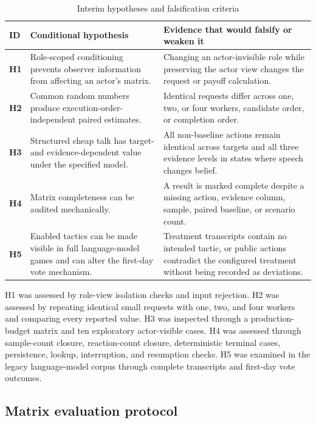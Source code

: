 \documentclass[11pt,a4paper]{article}
\begin{document}
\begin{table}[htbp]
\centering
\caption{Interim hypotheses and falsification criteria}
\begin{tabularx}{\textwidth}{>{\bfseries}p{}YY}
\toprule
ID & Conditional hypothesis & Evidence that would falsify or weaken it \\
\midrule
H1 & Role-scoped conditioning prevents observer information from affecting an actor's matrix. & Changing an actor-invisible role while preserving the actor view changes the request or payoff calculation. \\
H2 & Common random numbers produce execution-order-independent paired estimates. & Identical requests differ across one, two, or four workers, candidate order, or completion order. \\
H3 & Structured cheap talk has target- and evidence-dependent value under the specified model. & All non-baseline actions remain identical across targets and all three evidence levels in states where speech changes belief. \\
H4 & Matrix completeness can be audited mechanically. & A result is marked complete despite a missing action, evidence column, sample, paired baseline, or scenario count. \\
H5 & Enabled tactics can be made visible in full language-model games and can alter the first-day vote mechanism. & Treatment transcripts contain no intended tactic, or public actions contradict the configured treatment without being recorded as deviations. \\
\bottomrule
\end{tabularx}
\end{table}

H1 was assessed by role-view isolation checks and input rejection. H2 was assessed by repeating identical small requests with one, two, and four workers and comparing every reported value. H3 was inspected through a production-budget matrix and ten exploratory actor-visible cases. H4 was assessed through sample-count closure, reaction-count closure, deterministic terminal cases, persistence, lookup, interruption, and resumption checks. H5 was examined in the legacy language-model corpus through complete transcripts and first-day vote outcomes.

\subsection{Matrix evaluation protocol}
\end{document}
